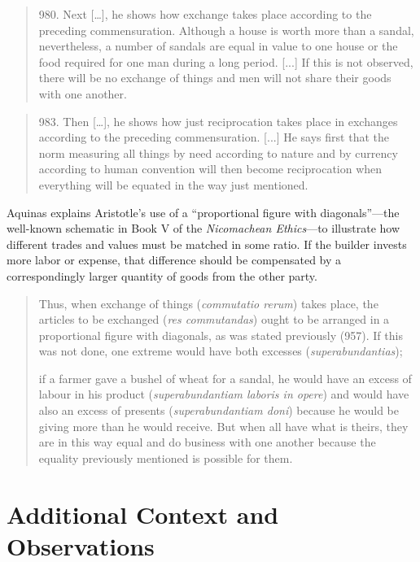     \begin{quote}
        980. Next […], he shows how exchange takes place according to the preceding commensuration. Although a house is worth more than a sandal, nevertheless, a number of sandals are equal in value to one house or the food required for one man during a long period. [...] If this is not observed, there will be no exchange of things and men will not share their goods with one another.
    \end{quote}
    
    \begin{quote}
        983. Then […], he shows how just reciprocation takes place in exchanges according to the preceding commensuration. [...] He says first that the norm measuring all things by need according to nature and by currency according to human convention will then become reciprocation when everything will be equated in the way just mentioned.
    \end{quote}
    
    Aquinas explains Aristotle’s use of a “proportional figure with diagonals”—the well-known schematic in Book V of the \textit{Nicomachean Ethics}—to illustrate how different trades and values must be matched in some ratio. If the builder invests more labor or expense, that difference should be compensated by a correspondingly larger quantity of goods from the other party.

    \begin{quote}
        Thus, when exchange of things (\textit{commutatio rerum}) takes place, the articles to be exchanged (\textit{res commutandas}) ought to be arranged in a proportional figure with diagonals, as was stated previously (957). If this was not done, one extreme would have both excesses (\textit{superabundantias});
    
        if a farmer gave a bushel of wheat for a sandal, he would have an excess of labour in his product (\textit{superabundantiam laboris in opere}) and would have also an excess of presents (\textit{superabundantiam doni}) because he would be giving more than he would receive. But when all have what is theirs, they are in this way equal and do business with one another because the equality previously mentioned is possible for them.
    \end{quote}

\section*{Additional Context and Observations}

